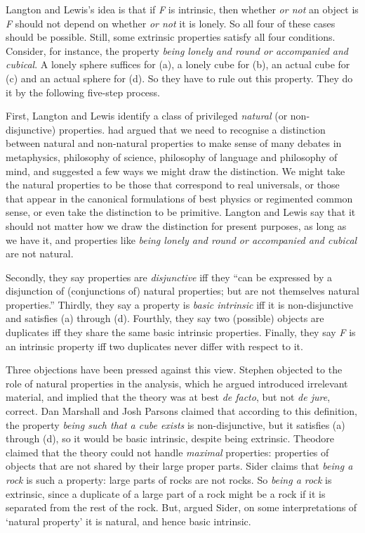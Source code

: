 \noindent Langton and Lewis's idea is that if \textit{F} is intrinsic, then whether \textit{or not} an object is \textit{F} should not depend on whether \textit{or not} it is lonely. So all four of these cases should be possible. Still, some extrinsic properties satisfy all four conditions. Consider, for instance, the property \textit{being lonely and round or accompanied and cubical}. A lonely sphere suffices for (a), a lonely cube for (b), an actual cube for (c) and an actual sphere for (d). So they have to rule out this property. They do it by the following five-step process.

First, Langton and Lewis identify a class of privileged \textit{natural} (or non-disjunctive) properties. \citet{Lewis1983e} had argued that we need to recognise a distinction between natural and non-natural properties to make sense of many debates in metaphysics, philosophy of science, philosophy of language and philosophy of mind, and suggested a few ways we might draw the distinction. We might take the natural properties to be those that correspond to real universals, or those that appear in the canonical formulations of best physics or regimented common sense, or even take the distinction to be primitive. Langton and Lewis say that it should not matter how we draw the distinction for present purposes, as long as we have it, and properties like \textit{being lonely and round or accompanied and cubical} are not natural.

Secondly, they say properties are \textit{disjunctive} iff they ``can be expressed by a disjunction of (conjunctions of) natural properties; but are not themselves natural properties.'' Thirdly, they say a property is \textit{basic intrinsic} iff it is non-disjunctive and satisfies (a) through (d). Fourthly, they say two (possible) objects are duplicates iff they share the same basic intrinsic properties. Finally, they say \textit{F} is an intrinsic property iff two duplicates never differ with respect to it.

Three objections have been pressed against this view. Stephen \citet{Yablo1999} objected to the role of natural properties in the analysis, which he argued introduced irrelevant material, and implied that the theory was at best \textit{de facto}, but not \textit{de jure}, correct. Dan Marshall and Josh Parsons \citeyearpar{Marshall2001} claimed that according to this definition, the property \textit{being such that a cube exists} is non-disjunctive, but it satisfies (a) through (d), so it would be basic intrinsic, despite being extrinsic. Theodore \citet{Sider2001-SIDMAI} claimed that the theory could not handle \textit{maximal} properties: properties of objects that are not shared by their large proper parts. Sider claims that \textit{being a rock} is such a property: large parts of rocks are not rocks. So \textit{being a rock} is extrinsic, since a duplicate of a large part of a rock might be a rock if it is separated from the rest of the rock. But, argued Sider, on some interpretations of `natural property' it is natural, and hence basic intrinsic.

